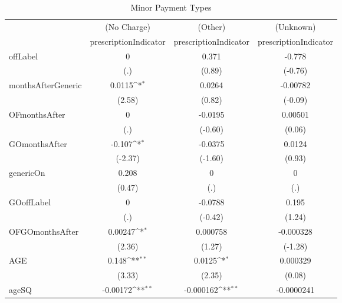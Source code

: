 \begin{table}[htbp]\centering
\def\sym#1{\ifmmode^{#1}\else\(^{#1}\)\fi}
\caption{Minor Payment Types\label{tab1}}
\begin{tabular}{l*{3}{c}}
\hline\hline
            &\multicolumn{1}{c}{(No Charge)}&\multicolumn{1}{c}{(Other)}&\multicolumn{1}{c}{(Unknown)}\\
            &\multicolumn{1}{c}{prescriptionIndicator}&\multicolumn{1}{c}{prescriptionIndicator}&\multicolumn{1}{c}{prescriptionIndicator}\\
\hline
offLabel    &           0         &       0.371         &      -0.778         \\
            &         (.)         &      (0.89)         &     (-0.76)         \\
[1em]
monthsAfterGeneric&      0.0115\sym{*}  &      0.0264         &    -0.00782         \\
            &      (2.58)         &      (0.82)         &     (-0.09)         \\
[1em]
OFmonthsAfter&           0         &     -0.0195         &     0.00501         \\
            &         (.)         &     (-0.60)         &      (0.06)         \\
[1em]
GOmonthsAfter&      -0.107\sym{*}  &     -0.0375         &      0.0124         \\
            &     (-2.37)         &     (-1.60)         &      (0.93)         \\
[1em]
genericOn   &       0.208         &           0         &           0         \\
            &      (0.47)         &         (.)         &         (.)         \\
[1em]
GOoffLabel  &           0         &     -0.0788         &       0.195         \\
            &         (.)         &     (-0.42)         &      (1.24)         \\
[1em]
OFGOmonthsAfter&     0.00247\sym{*}  &    0.000758         &   -0.000328         \\
            &      (2.36)         &      (1.27)         &     (-1.28)         \\
[1em]
AGE         &       0.148\sym{**} &      0.0125\sym{*}  &    0.000329         \\
            &      (3.33)         &      (2.35)         &      (0.08)         \\
[1em]
ageSQ       &    -0.00172\sym{**} &   -0.000162\sym{**} &  -0.0000241         \\

\end{tabular}
\end{table}
